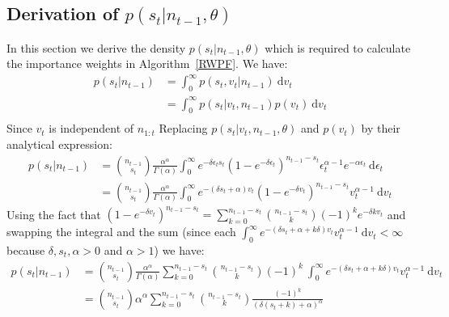 \documentclass[12pt]{article}
\begin{document}
\begin{appendices}
	\subsection{Derivation of $p(s_t|n_{t-1}, \theta)$} \label{sDensity}
	In this section we derive the density $p(s_t|n_{t-1}, \theta)$ which is required to calculate the importance weights in Algorithm~\ref{RWPF}.
	We have:
	\begin{align*}
	p(s_t | n_{t-1}) & = \int_{0}^{\infty}p(s_t, v_t | n_{t-1})\ \mathrm{d}v_t \\
	& = \int_{0}^{\infty}p(s_t | v_t, n_{t-1})p(v_t)\ \mathrm{d}v_t \\
	\end{align*}
	Since $v_t$ is independent of $n_{1:t}$
	Replacing $p(s_t | v_t, n_{t-1}, \theta)$ and $p(v_t)$ by their analytical expression:
	\begin{align*}
	p(s_t | n_{t-1}) & = \binom{n_{t-1}}{s_t}\frac{\alpha^\alpha}{\Gamma(\alpha)} \int_{0}^{\infty}e^{-\delta\epsilon_t s_t}(1-e^{-\delta\epsilon_t})^{n_{t-1}-s_t}\epsilon_t^{\alpha-1}e^{-\alpha\epsilon_t}\ \mathrm{d}\epsilon_t \\
	& = \binom{n_{t-1}}{s_t}\frac{\alpha^\alpha}{\Gamma(\alpha)}\int_{0}^{\infty}e^{-(\delta s_t+\alpha)v_t }(1-e^{-\delta v_t})^{n_{t-1}-s_t}v_t^{\alpha-1}\ \mathrm{d}v_t
	\end{align*}
	Using the fact that $(1-e^{-\delta v_t})^{n_{t-1}-s_t} = \sum_{k=0}^{n_{t-1}-s_t}\binom{n_{t-1}-s_t}{k}(-1)^ke^{-\delta k v_t}$ and swapping the integral and the sum (since each $\int_{0}^{\infty}e^{-(\delta s_t+\alpha + k\delta)v_t }v_t^{\alpha-1}\ \mathrm{d}v_t < \infty$ because $\delta,  s_t, \alpha > 0$ and $\alpha > 1$) we have:
	\begin{align*}
	p(s_t | n_{t-1}) & = \binom{n_{t-1}}{s_t}\frac{\alpha^\alpha}{\Gamma(\alpha)}\sum_{k=0}^{n_{t-1}-s_t}\binom{n_{t-1}-s_t}{k}(-1)^k \ \int_{0}^{\infty}e^{-(\delta s_t+\alpha + k\delta)v_t }v_t^{\alpha-1}\ \mathrm{d}v_t \\
	& = \binom{n_{t-1}}{s_t}\alpha^\alpha\sum_{k=0}^{n_{t-1}-s_t}\binom{n_{t-1}-s_t}{k}\frac{(-1)^k}{(\delta(s_t+k)+\alpha)^\alpha}
	\end{align*}
	

\end{appendices}
\end{document}
